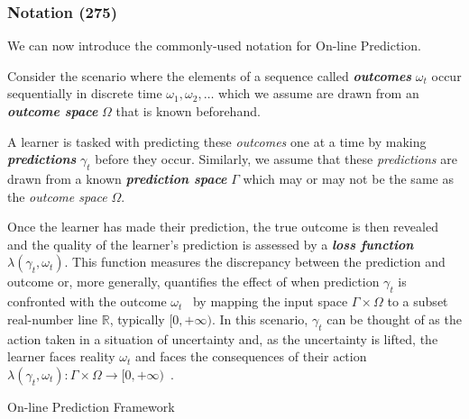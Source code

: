 \subsubsection*{Notation (275)}
We can now introduce the commonly-used notation for On-line Prediction. 

Consider the scenario where the elements of a sequence called \textbf{\textit{outcomes}}  $\omega_t$ occur sequentially in discrete time $\omega_1, \omega_2, \ldots$ which we assume are drawn from an \textbf{\textit{outcome space}} $\Omega$ that is known beforehand. 

A learner is tasked with predicting these \textit{outcomes} one at a time by making \textbf{\textit{predictions}} $\gamma_t$ before they occur. Similarly, we assume that these \textit{predictions} are drawn from a known \textbf{\textit{prediction space}} $\Gamma$ which may or may not be the same as the \textit{outcome space} $\Omega$.

Once the learner has made their prediction, the true outcome is then revealed and the quality of the learner's prediction is assessed by a \textbf{\textit{loss function}} $\lambda(\gamma_t, \omega_t)$. This function measures the discrepancy between the prediction and outcome or, more generally, quantifies the effect of when prediction $\gamma_t$ is confronted with the outcome $\omega_t$~\cite{adamskiy:2019} by mapping the input space $\Gamma \times \Omega$ to a subset real-number line $\mathbb{R}$, typically $[0, +\infty)$. In this scenario, $\gamma_t$ can be thought of as the action taken in a situation of uncertainty and, as the uncertainty is lifted, the learner faces reality $\omega_t$ and faces the consequences of their action $\lambda(\gamma_t, \omega_t) : \Gamma\times\Omega\rightarrow[0,+\infty)$~\cite{kalnishkan:2009}.


\begin{protocol}[H]
    \caption{On-line Prediction Framework}\label{on-line_prediction_framework}
    \begin{algorithmic}[1]
    \end{algorithmic}
\end{protocol}

